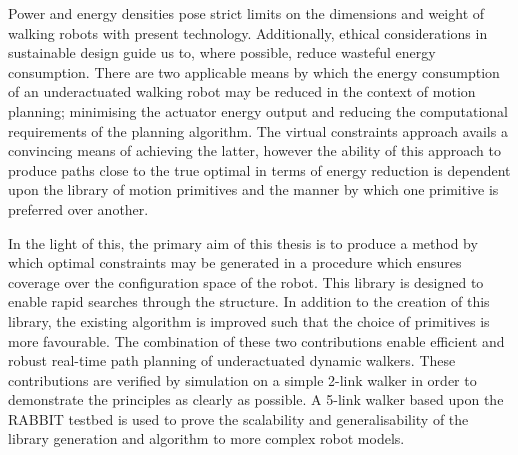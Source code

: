 Power and energy densities pose strict limits on the dimensions and weight of walking robots with present technology. Additionally, ethical considerations in sustainable design guide us to, where possible, reduce wasteful energy consumption. There are two applicable means by which the energy consumption of an underactuated walking robot may be reduced in the context of motion planning; minimising the actuator energy output and reducing the computational requirements of the planning algorithm. The virtual constraints approach avails a convincing means of achieving the latter, however the ability of this approach to produce paths close to the true optimal in terms of energy reduction is dependent upon the library of motion primitives and the manner by which one primitive is preferred over another.

In the light of this, the primary aim of this thesis is to produce a method by which optimal constraints may be generated in a procedure which ensures coverage over the configuration space of the robot. This library is designed to enable rapid searches through the structure. In addition to the creation of this library, the existing algorithm is improved such that the choice of primitives is more favourable. The combination of these two contributions enable efficient and robust real-time path planning of underactuated dynamic walkers. These contributions are verified by simulation on a simple 2-link walker in order to demonstrate the principles as clearly as possible. A 5-link walker based upon the RABBIT testbed \cite{chevallereau2003rabbit} is used to prove the scalability and generalisability of the library generation and algorithm to more complex robot models.